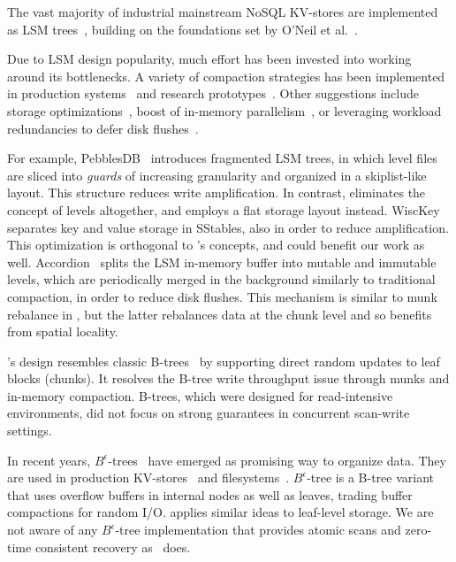 

The vast majority of industrial mainstream NoSQL KV-stores are  implemented as LSM trees~\cite{hbase, 
RocksDB, scylladb, Bigtable2008, cassandra2010}, building on the foundations set by O'Neil 
et al.~\cite{O'Neil1996, Muth1998}. 

Due to LSM design popularity, much effort has been invested into working around its bottlenecks.
A variety of compaction strategies has been implemented in production systems~\cite{CallaghanCompaction, 
ScyllaCompaction} and research prototypes~\cite{triad, PebblesDB}. Other suggestions include storage
optimizations~\cite{WiscKey, PebblesDB}, boost of in-memory parallelism~\cite{scylladb, clsm2015}, or leveraging 
 workload redundancies to defer disk flushes~\cite{triad, accordion}. 

For example, PebblesDB~\cite{PebblesDB} introduces fragmented LSM trees, in which level files are 
sliced into {\em guards\/} of increasing granularity and organized in a skiplist-like layout. This structure 
reduces write amplification. In contrast, \sys\/ eliminates the concept of levels altogether, 
and employs a flat storage layout instead. WiscKey~\cite{WiscKey} separates key and value storage 
in SStables, also in order to reduce amplification. This optimization is orthogonal to \sys's concepts,
and could benefit our work as well. Accordion~\cite{accordion} splits the LSM in-memory buffer into mutable 
and immutable levels, which are periodically merged in the background similarly to traditional compaction, 
in order to reduce disk flushes. This mechanism is similar to munk rebalance in \sys, 
but the latter rebalances data at the chunk level and so benefits from spatial locality.

\sys's design resembles classic B-trees~\cite{Knuth:1998:ACP:280635} by supporting direct random updates to leaf blocks (chunks). 
It resolves the B-tree write throughput issue through munks and in-memory compaction. B-trees, which were 
designed for read-intensive environments, did not focus on strong guarantees in concurrent  scan-write settings. 

In  recent years, $B^{\epsilon}$-trees~\cite{Brodal:2003:LBE:644108.644201} have emerged 
as promising way to organize data. They are used in production KV-stores~\cite{TokuDB} and filesystems~\cite{BetrFS}. 
$B^{\epsilon}$-tree is a B-tree variant that uses overflow buffers in internal nodes as well as leaves, trading buffer 
compactions for random I/O. \sys\/ applies similar ideas to leaf-level storage.  We are not aware of any 
$B^{\epsilon}$-tree implementation that provides atomic scans and zero-time consistent recovery as \sys\ does. 

